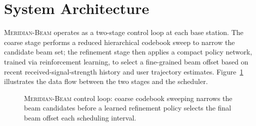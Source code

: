 \section{System Architecture}
\textsc{Meridian-Beam} operates as a two-stage control loop at each base
station. The coarse stage performs a reduced hierarchical codebook sweep to
narrow the candidate beam set; the refinement stage then applies a compact
policy network, trained via reinforcement learning, to select a fine-grained
beam offset based on recent received-signal-strength history and user
trajectory estimates. Figure~\ref{fig:architecture} illustrates the data flow
between the two stages and the scheduler.

\begin{figure}[htbp]
\centering
{}
\caption{\textsc{Meridian-Beam} control loop: coarse codebook sweeping narrows
the beam candidates before a learned refinement policy selects the final beam
offset each scheduling interval.}
\label{fig:architecture}
\end{figure}
